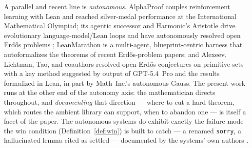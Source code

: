 \documentclass[11pt]{article}
\theoremstyle{plain}
\theoremstyle{definition}
\theoremstyle{remark}
\newcommand{\lean}[1]{\texttt{#1}}
\begin{document}
A parallel and recent line is \emph{autonomous}. AlphaProof \cite{AlphaProof}
couples reinforcement learning with Lean and reached silver-medal performance at
the International Mathematical Olympiad; its agentic successor
\cite{AlphaProofNexus} and Harmonic's Aristotle \cite{Aristotle} drive
evolutionary language-model/Lean loops and have autonomously resolved open
Erd\H{o}s problems \cite{Erdos728}; LeanMarathon \cite{LeanMarathon} is a
multi-agent, blueprint-centric harness that autoformalizes the theorems of recent
Erd\H{o}s-problem papers; and Alexeev, Lichtman, Tao, and coauthors
\cite{PrimitiveSets} resolved open Erd\H{o}s conjectures on primitive sets with
a key method suggested by output of GPT-5.4~Pro and the results formalized in
Lean, in part by Math~Inc.'s autonomous Gauss. The present work runs at the
other end of the autonomy axis: the mathematician directs throughout, and
\emph{documenting} that direction --- where to cut a hard theorem, which routes
the ambient library can support, when to abandon one --- is itself a facet of
the paper. The autonomous systems do exhibit exactly the failure mode the win condition
(Definition~\ref{def:win}) is built to catch --- a renamed \lean{sorry}, a hallucinated
lemma cited as settled --- documented by the systems' own authors \cite{AlphaProofNexus}.
\end{document}

